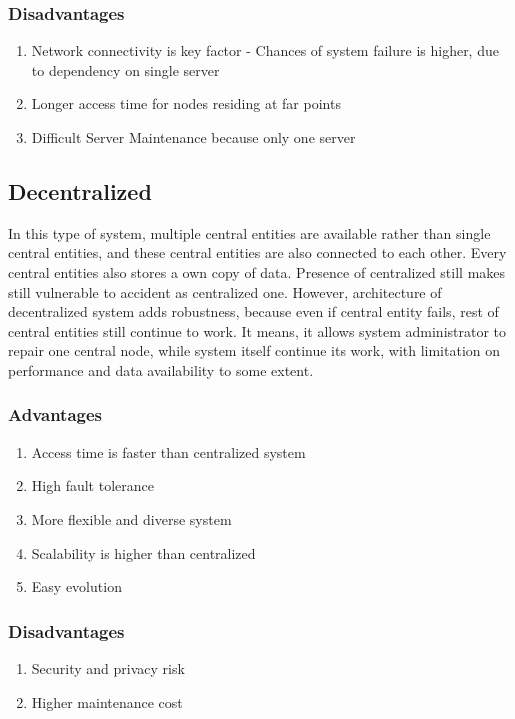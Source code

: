 \documentclass[a4paper,twoside,12pt]{report}
\begin{document}
\begin{spacing}{1.5}
\subsubsection{Disadvantages}
	\begin{enumerate}
	\item{Network connectivity is key factor - Chances of system failure is higher, due to dependency on single server}
	\item{Longer access time for nodes residing at far points}
	\item{Difficult Server Maintenance because only one server}
\end{enumerate}	 
\subsection{Decentralized}
In this type of system, multiple central entities are available rather than single central entities, and these central entities are also connected to each other. Every central entities also stores a own copy of data. Presence of centralized still makes still vulnerable to accident as centralized one. However, architecture of decentralized system adds robustness, because even if central entity fails, rest of central entities still continue to work. It means, it allows system administrator to repair one central node, while system itself continue its work, with limitation on performance and data availability to some extent.   
\subsubsection{Advantages}
\begin{enumerate}
	\item{Access time is faster than centralized system}
	\item{High fault tolerance}
	\item{More flexible and diverse system}
	\item{Scalability is higher than centralized}
	\item{Easy evolution}
\end{enumerate}
\subsubsection{Disadvantages}
\begin{enumerate}
	\item{Security and privacy risk}
	\item{Higher maintenance cost}
\end{enumerate}

\end{spacing}
\end{document}
